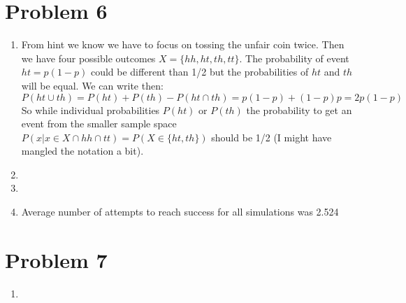 \documentclass{article}
\newcommand{\1}{\mathbf{1}}
\begin{document}
\newpage
\section*{Problem 6}
\begin{enumerate}
    \item From hint we know we have to focus on tossing the unfair coin twice. Then we have four possible outcomes $X=\{hh, ht, th, tt\}$. The probability of event $ht = p(1-p)$ could be different than 1/2 but the probabilities of $ht$ and $th$ will be equal. We can write then:
    $$P(ht \cup th) = P(ht) + P(th) - P(ht \cap th) = p(1-p) + (1-p)p = 2p(1-p)$$
    So while individual probabilities $P(ht)$ or $P(th)$ the probability to get an event from the smaller sample space $P(x|x \in X \cap hh \cap tt) = P(X\in\{ht, th\})$ should be 1/2 (I might have mangled the notation a bit).
    
    \item 
    
    \item 
    
    \item Average number of attempts to reach success for all simulations was 2.524
\end{enumerate}


\newpage
\section*{Problem 7}
\begin{enumerate}
    \item 
\end{enumerate}
\end{document}
